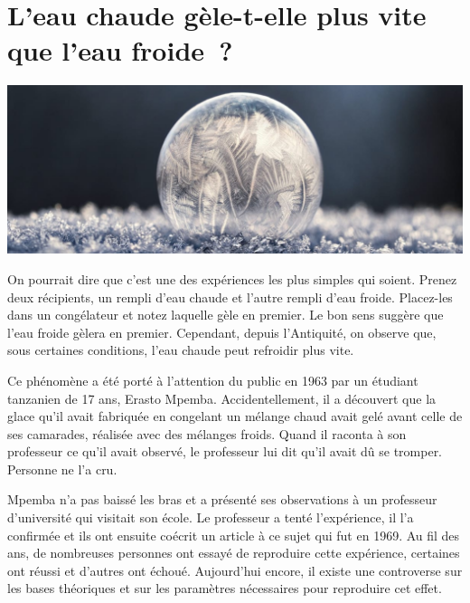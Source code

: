 \documentclass[
  10pt,
  french,
  a5paper,
  openany]{book}
\begin{document}
\hypertarget{leau-chaude-guxe8le-t-elle-plus-vite-que-leau-froide}{%
\chapter{\texorpdfstring{L'eau chaude gèle-t-elle \linebreak plus vite que l'eau froide~?}{L'eau chaude gèle-t-elle plus vite que l'eau froide~?}}\label{leau-chaude-guxe8le-t-elle-plus-vite-que-leau-froide}}

\begin{center}
\includegraphics[width=1\textwidth,height=\textheight]{images/eau-chaude.jpg}

\end{center}

On pourrait dire que c'est une des expériences les plus simples qui soient. Prenez deux récipients, un rempli d'eau chaude et l'autre rempli d'eau froide. Placez-les dans un congélateur et notez laquelle gèle en premier. Le bon sens suggère que l'eau froide gèlera en premier. Cependant, depuis l'Antiquité, on observe que, sous certaines conditions, l'eau chaude peut refroidir plus vite.

Ce phénomène a été porté à l'attention du public en 1963 par un étudiant tanzanien de 17 ans, Erasto Mpemba. Accidentellement, il a découvert que la glace qu'il avait fabriquée en congelant un mélange chaud avait gelé avant celle de ses camarades, réalisée avec des mélanges froids. Quand il raconta à son professeur ce qu'il avait observé, le professeur lui dit qu'il avait dû se tromper. Personne ne l'a cru.

Mpemba n'a pas baissé les bras et a présenté ses observations à un professeur d'université qui visitait son école. Le professeur a tenté l'expérience, il l'a confirmée et ils ont ensuite coécrit un article à ce sujet qui fut en 1969. Au fil des ans, de nombreuses personnes ont essayé de reproduire cette expérience, certaines ont réussi et d'autres ont échoué. Aujourd'hui encore, il existe une controverse sur les bases théoriques et sur les paramètres nécessaires pour reproduire cet effet.
\end{document}
